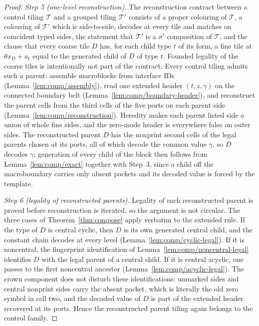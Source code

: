 \begin{proof}
\emph{Step 5 (one-level reconstruction).}  The reconstruction contract
between a control tiling $\mathcal T$ and a grouped tiling $\mathcal T'$
consists of a proper colouring of $\mathcal T$, a colouring of $\mathcal T'$
which is side-to-side, decodes at every tile and matches on coincident
typed sides, the statement that $\mathcal T'$ is a $\sigma'$ composition of
$\mathcal T$, and the clause that every coarse tile $D$ has, for each child
type $t$ of its form, a fine tile at $\theta x_D+a_t$ equal to the
generated child of $D$ of type $t$.  Founded legality of the coarse tiles is
intentionally not part of the contract.  Every control tiling admits such
a parent: assemble macroblocks from interface IDs
(Lemma~\ref{lem:comp/assembly}), read one extended header $(t,z,\gamma)$ on
the connected boundary belt (Lemma~\ref{lem:comp/boundary-header}), and
reconstruct the parent cells from the third cells of the five ports on each
parent side (Lemma~\ref{lem:comp/reconstruction}).  Heredity makes each
parent listed side a union of whole fine sides, and the zero-mode header is
everywhere false on outer sides.  The reconstructed parent $D$ has the
nonprint second cells of the legal parents chosen at its ports, all of
which decode the common value $\gamma$, so $D$ decodes $\gamma$; generation
of every child of the block then follows from Lemma~\ref{lem:comp/exact}
together with Step~3, since a child off the macroboundary carries only
absent packets and its decoded value is forced by the template.

\emph{Step 6 (legality of reconstructed parents).}  Legality of each
reconstructed parent is proved before reconstruction is iterated, so the
argument is not circular.  The three cases of Theorem~\ref{thm:compose}
apply verbatim to the extended rule.  If the type of $D$ is central cyclic,
then $D$ is its own generated central child, and the constant chain
decodes at every level (Lemma~\ref{lem:comp/cyclic-legal}).  If it is
noncentral, the fingerprint identification of
Lemma~\ref{lem:comp/noncentral-legal} identifies $D$ with the legal parent
of a central child.  If it is central acyclic, one passes to the first
noncentral ancestor (Lemma~\ref{lem:comp/acyclic-legal}).  The crown
component does not disturb these identifications: unmarked sides and
central nonprint sides carry the absent packet, which is literally the old
zero symbol in cell two, and the decoded value of $D$ is part of the
extended header recovered at its ports.  Hence the reconstructed parent
tiling again belongs to the control family.


\end{proof}
